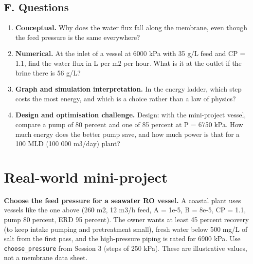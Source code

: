 \documentclass[11pt,a4paper]{article}
\begin{document}
\subsection*{F. Questions}
\begin{enumerate}[nosep]
\item \textbf{Conceptual.} Why does the water flux fall along the membrane, even though the feed pressure is the same everywhere?
\item \textbf{Numerical.} At the inlet of a vessel at 6000 kPa with 35 g/L feed and CP = 1.1, find the water flux in L per m2 per hour. What is it at the outlet if the brine there is 56 g/L?
\item \textbf{Graph and simulation interpretation.} In the energy ladder, which step costs the most energy, and which is a choice rather than a law of physics?
\item \textbf{Design and optimisation challenge.} Design: with the mini-project vessel, compare a pump of 80 percent and one of 85 percent at P = 6750 kPa. How much energy does the better pump save, and how much power is that for a 100 MLD (100 000 m3/day) plant?
\end{enumerate}

\section{Real-world mini-project}
\textbf{Choose the feed pressure for a seawater RO vessel.} A coastal plant uses vessels like the one above (260 m2, 12 m3/h feed, A = 1e-5, B = 8e-5, CP = 1.1, pump 80 percent, ERD 95 percent). The owner wants at least 45 percent recovery (to keep intake pumping and pretreatment small), fresh water below 500 mg/L of salt from the first pass, and the high-pressure piping is rated for 6900 kPa. Use \texttt{choose\_pressure} from Session 3 (steps of 250 kPa). These are illustrative values, not a membrane data sheet.
\end{document}
